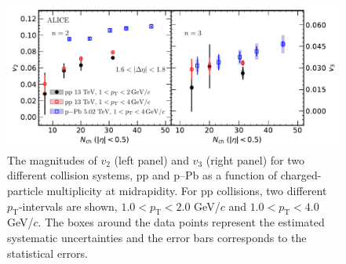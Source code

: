 \begin{figure}[!t]
	\centering
\includegraphics[width=1.0\textwidth]{figures/FIG5_v2Mult_allSystems_Data.pdf} 
	\caption{The magnitudes of $v_2$ (left
    panel) and $v_3$ (right panel) 
 for two different collision systems, pp and p--Pb as a function of charged-particle multiplicity at midrapidity. For pp collisions, two different $p_\mathrm{T}$-intervals are shown, $1.0<p_\mathrm{T}<2.0$ GeV/$c$ and $1.0<p_\mathrm{T}<4.0$ GeV/$c$. The boxes around the data points represent the estimated systematic uncertainties and the error bars corresponds to the statistical errors.} 
	\label{fig:v2mult}
\end{figure}

